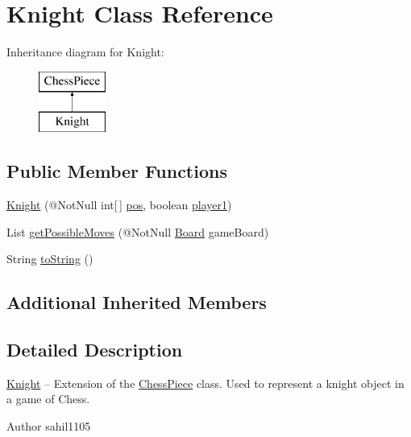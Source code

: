 \hypertarget{class_knight}{}\section{Knight Class Reference}
\label{class_knight}
Inheritance diagram for Knight\+:\begin{figure}[H]
\begin{center}
\leavevmode
\includegraphics[height=2.000000cm]{class_knight}
\end{center}
\end{figure}
\subsection*{Public Member Functions}
\begin{DoxyCompactItemize}
\item 
\mbox{\hyperlink{class_knight_aba6db24f094cf45339b4e52e36c43e9e}{Knight}} (@Not\+Null int\mbox{[}$\,$\mbox{]} \mbox{\hyperlink{class_chess_piece_ae9f0da2b5fca2557eab359044a7ba1ac}{pos}}, boolean \mbox{\hyperlink{class_chess_piece_aa8711ff5ce8a45159b9b30c8148a34b2}{player1}})
\item 
List \mbox{\hyperlink{class_knight_ad3e2ae082501548e6be42e083807769f}{get\+Possible\+Moves}} (@Not\+Null \mbox{\hyperlink{class_board}{Board}} game\+Board)
\item 
String \mbox{\hyperlink{class_knight_a6b3796f80d286950a50b293e7972124b}{to\+String}} ()
\end{DoxyCompactItemize}
\subsection*{Additional Inherited Members}


\subsection{Detailed Description}
\mbox{\hyperlink{class_knight}{Knight}} -- Extension of the \mbox{\hyperlink{class_chess_piece}{Chess\+Piece}} class. Used to represent a knight object in a game of Chess. \begin{DoxyAuthor}{Author}
sahil1105 
\end{DoxyAuthor}


